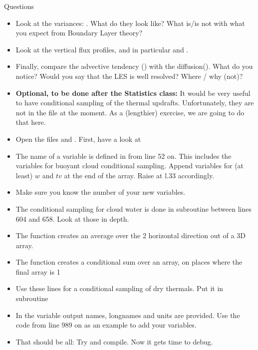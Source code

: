 \begin{frame}[allowframebreaks]{Questions}
\begin{itemize}
 \item Look at the variances: . What do they look like? What is/is not with what you expect from Boundary Layer theory?
 \item Look at the vertical flux profiles, and in particular  and . 
 \item Finally, compare the advective tendency () with the diffusion(). What do you notice? Would you say that the LES is well resolved? Where / why (not)?
\pagebreak
 \item \textbf{Optional, to be done after the Statistics class:} It would be very useful to have conditional sampling of the thermal updrafts. Unfortunately, they are not in the  file at the moment. As a (lengthier) exercise, we are going to do that here.
 \item Open the files  and . First, have a look at 
 \item The name of a  variable is defined in  from line 52 on. This includes the  variables for buoyant cloud conditional sampling. Append  variables for (at least) $w$ and $tv$ at the end of the array. Raise  at l.33 accordingly.
 \item Make sure you know the number of your new variables.
 \item The conditional sampling for cloud water is done in subroutine  between lines 604 and 658. Look at those in depth.
 \item The function  creates an average over the 2 horizontal direction out of a 3D array.
 \item The function  creates a conditional sum over an array, on places where  the final array is 1
 \item Use these lines for a conditional sampling of dry thermals. Put it in subroutine 
 \item In  the variable output names, longnames and units are provided. Use the code from line 989 on as an example to add your variables.
 \item That should be all: Try and compile. Now it gets time to debug.
 \end{itemize}

\end{frame}

